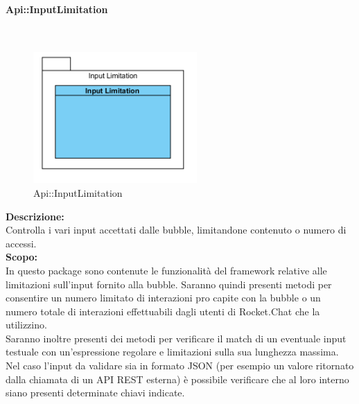 \begin{samepage}
\paragraph{Api\-::Input\-Limitation}\label{api-limiti}\mbox{}\\
\nopagebreak
\begin{figure}[H]
	\centering
	\includegraphics[height=5cm]{diagrammi_img/classi_e_package/api_limitinput.png}
	\caption{Api\-::Input\-Limitation}
\end{figure}
\end{samepage}
\textbf{Descrizione:}\\
Controlla i vari input accettati dalle bubble, limitandone contenuto o numero di accessi.\\
\textbf{Scopo:}\\
In questo package sono contenute le funzionalità del framework relative alle limitazioni sull'input fornito alla bubble. Saranno quindi presenti metodi per consentire un numero limitato di interazioni pro capite con la bubble o un numero totale di interazioni effettuabili dagli utenti di Rocket.Chat che la utilizzino.\\
Saranno inoltre presenti dei metodi per verificare il match di un eventuale input testuale con un'espressione regolare e limitazioni sulla sua lunghezza massima. Nel caso l'input da validare sia in formato JSON (per esempio un valore ritornato dalla chiamata di un API REST esterna) è possibile verificare che al loro interno siano presenti determinate chiavi indicate.

